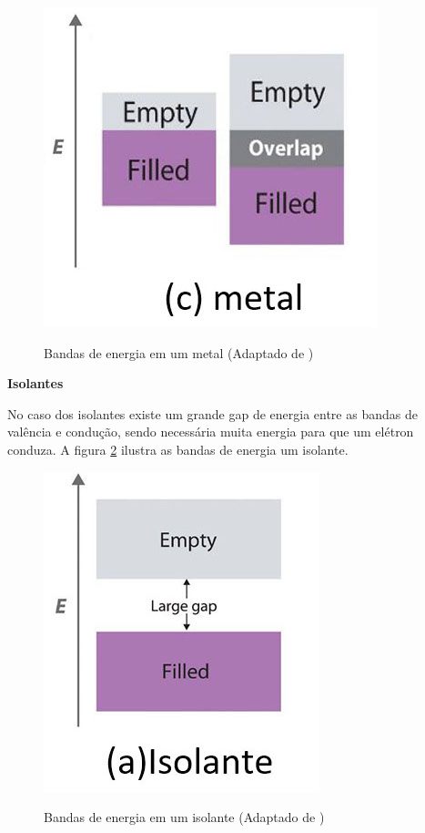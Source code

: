 	\begin{figure}[h!]
      \caption{Bandas de energia em um metal (Adaptado de \cite{bulk1})}
      \centering
      \includegraphics{images/figura3.jpg}
      \label{fig3}
    \end{figure}

	\par \textbf{Isolantes}

	\par No caso dos isolantes existe um grande gap de energia entre as bandas de valência e condução, sendo necessária muita energia para que um elétron conduza. A figura \ref{fig4} ilustra as bandas de energia um isolante.

	\begin{figure}[h!]
      \caption{Bandas de energia em um isolante (Adaptado de \cite{bulk1})}
      \centering
      \includegraphics{images/figura4.jpg}
      \label{fig4}
    \end{figure}

